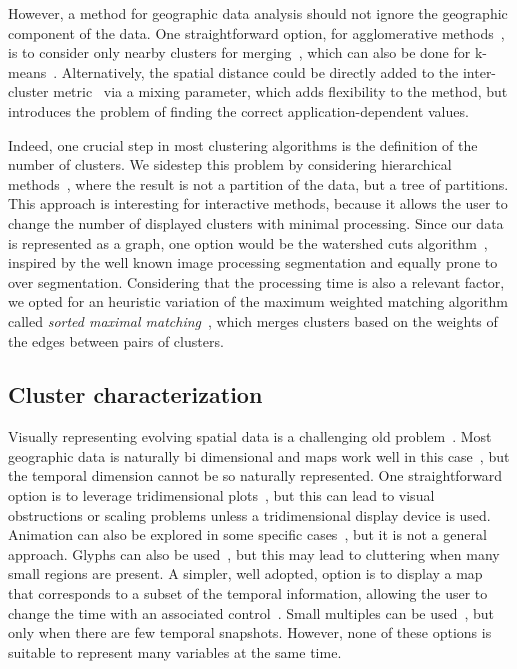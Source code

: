 However, a method for geographic data analysis should not ignore the geographic
component of the data. One straightforward option, for agglomerative
methods~\cite{han2001spatial}, is to consider only nearby clusters for
merging~\cite{Chavent2017}, which can also be done for
k-means~\cite{soor2018extending}. Alternatively, the spatial distance could be
directly added to the inter-cluster metric~\cite{Chavent2017} via a mixing
parameter, which adds flexibility to the method, but introduces the problem of
finding the correct application-dependent values.

Indeed, one crucial step in most clustering algorithms is the definition of the
number of clusters. We sidestep this problem by considering hierarchical
methods~\cite{soille2012morphological}, where the result is not a partition of
the data, but a tree of partitions. This approach is interesting for interactive
methods, because it allows the user to change the number of displayed clusters
with minimal processing. Since our data is represented as a graph, one option
would be the watershed cuts algorithm~\cite{Cousty2009}, inspired by the well
known image processing segmentation and equally prone to over segmentation.
Considering that the processing time is also a relevant factor, we opted for an
heuristic variation of the maximum weighted matching algorithm called
\emph{sorted maximal matching}~\cite{markus2017}, which merges clusters based on
the weights of the edges between pairs of clusters.



\subsection{Cluster characterization}
Visually representing evolving spatial data is a challenging old
problem~\cite{monmonier1990strategies,andrienko2003exploratory,ferreira2015visual,Zheng2016}.
Most geographic data is naturally bi dimensional and maps work well in this
case~\cite{Zheng2016,ward2015interactive}, but the temporal dimension cannot be
so naturally represented. One straightforward option is to leverage
tridimensional plots~\cite{andrienko2014visualization,Tominski2012a}, but this
can lead to visual obstructions or scaling problems unless a tridimensional
display device is used. Animation can also be explored in some specific
cases~\cite{buschmann2014real}, but it is not a general approach. Glyphs can
also be used~\cite{seebacher2017visual,Andrienko2017}, but this may lead to
cluttering when many small regions are present. A simpler, well adopted, option
is to display a map that corresponds to a subset of the temporal information,
allowing the user to change the time with an associated
control~\cite{Chen2017,Valdivia2015,Alce2018,Doraiswamy2014}. Small multiples
can be used~\cite{VonLandesberger2016}, but only when there are few temporal
snapshots. However, none of these options is suitable to represent many
variables at the same time.


